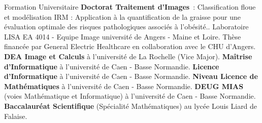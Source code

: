 \begin{rubric}{Formation Universitaire}
  \entry*[2004--2008]%
  \textbf{Doctorat Traitement d'Images}~: \og Classification floue et modélisation IRM : Application à la quantification de la graisse pour une évaluation optimale des risques pathologiques associés à l'obésité.\fg. Laboratoire \textsc{LISA EA 4014} - Equipe Image
  université de Angers - Maine et Loire. Thèse financée par General Electric Healthcare en collaboration avec le CHU d'Angers.
  \entry*[2003--2004]%
  \textbf{DEA Image et Calculs} à l'université de La Rochelle (Vice Major).
  \entry*[2001--2003]%
  \textbf{Maîtrise d'Informatique} à l'université de Caen - Basse Normandie. 
  \entry*[2000--2001]%
  \textbf{Licence d'Informatique} à l'université de Caen - Basse Normandie. 
  \entry*[1998-2000]%
  \textbf{Niveau Licence de Mathématiques} à l'université de Caen - Basse Normandie.
  \entry*[1996-1998]%
  \textbf{DEUG MIAS} (voies Mathématique et Informatique) à l'université de Caen - Basse Normandie.
  \entry*[1996]%
  \textbf{Baccalauréat Scientifique} (Spécialité Mathématiques) au lycée Louis Liard de Falaise.
\end{rubric}


%
